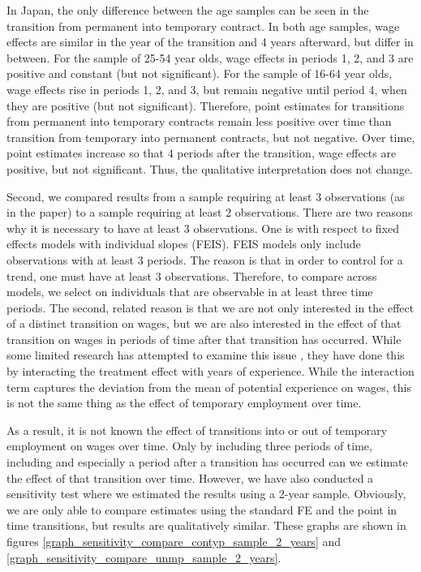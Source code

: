 In Japan, the only difference between the age samples can be seen in the transition from permanent into temporary contract.  In both age samples, wage effects are similar in the year of the transition and 4 years afterward, but differ in between.  For the sample of 25-54 year olds, wage effects in periods 1, 2, and 3 are positive and constant (but not significant).  For the sample of 16-64 year olds, wage effects rise in periods 1, 2, and 3, but remain negative until period 4, when they are positive (but not significant).  Therefore, point estimates for transitions from permanent into temporary contracts remain less positive over time than transition from temporary into permanent contracts, but not negative.  Over time, point estimates increase so that 4 periods after the transition, wage effects are positive, but not significant.  Thus, the qualitative interpretation does not change.

Second, we compared results from a sample requiring at least 3 observations (as in the paper) to a sample requiring at least 2 observations.  There are two reasons why it is necessary to have at least 3 observations.  One is with respect to fixed effects models with individual slopes (FEIS).  FEIS models only include observations with at least 3 periods.  The reason is that in order to control for a trend, one must have at least 3 observations.  Therefore, to compare across models, we select on individuals that are observable in at least three time periods.  The second, related reason is that we are not only interested in the effect of a distinct transition on wages, but we are also interested in the effect of that transition on wages in periods of time after that transition has occurred.  While some limited research has attempted to examine this issue \citep{booth_temporary_2002,mooi-reci_casual_2017}, they have done this by interacting the treatment effect with years of experience.  While the interaction term captures the deviation from the mean of potential experience on wages, this is not the same thing as the effect of temporary employment over time.  

As a result, it is not known the effect of transitions into or out of temporary employment on wages over time.  Only by including three periods of time, including and especially a period after a transition has occurred can we estimate the effect of that transition over time.  However, we have also conducted a sensitivity test where we estimated the results using a 2-year sample.  Obviously, we are only able to compare estimates using the standard FE and the point in time transitions, but results are qualitatively similar.  These graphs are shown in figures \ref{graph_sensitivity_compare_contyp_sample_2_years} and \ref{graph_sensitivity_compare_unmp_sample_2_years}.  

